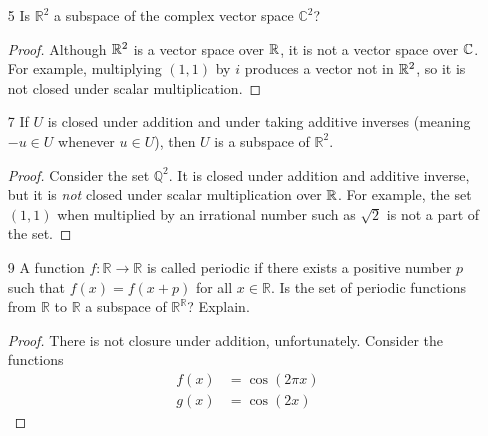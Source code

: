 \begin{enumerate}
\begin{proof}
        Consider $f$ in the set and $\lambda \in \R$. Let us show that $(\lambda f)(x) = \lambda f(x)$ is in the set. 
        \begin{align*}
            (\lambda f)'(-1) &= \\
            \lambda f'(-1) &= \\
            3\lambda f(2) &= \\
            3(\lambda f)(2)
        \end{align*}
        So we are closed under scalar multiplication.
    \end{proof}

    \item[5] Is $\mathbb{R}^2$ a subspace of the complex vector space $\mathbb{C}^2$?
    
    \begin{proof}
        Although $\mathbb{R}^2$ is a vector space over $\mathbb{R}$, it is not a vector space over $\mathbb{C}$. For example, multiplying $(1, 1)$ by $i$ produces a vector not in $\mathbb{R}^2$, so it is not closed under scalar multiplication. 
    \end{proof}

    \item[7] If \(U\) is closed under addition and under taking additive inverses (meaning
    \(-u \in U\) whenever \(u \in U\)), then \(U\) is a subspace of \(\mathbb{R}^2\).

    \begin{proof}
        Consider the set $\mathbb{Q}^2$. It is closed under addition and additive inverse, but it is \emph{not} closed under scalar multiplication over $\mathbb{R}$. For example, the set $(1, 1)$ when multiplied by an irrational number such as $\sqrt{2}$ is not a part of the set.
    \end{proof}

    \item[9] A function \(f : \mathbb{R} \to \mathbb{R}\) is called periodic if there exists a positive number
    \(p\) such that \(f(x) = f(x + p)\) for all \(x \in \mathbb{R}\). Is the set of periodic functions
    from \(\mathbb{R}\) to \(\mathbb{R}\) a subspace of \(\mathbb{R}^{\mathbb{R}}\)? Explain.

    \begin{proof}
        There is not closure under addition, unfortunately. Consider the functions 
        \begin{align*}
            f(x) &= \cos(2\pi x) \\
            g(x) &= \cos(2x)
        \end{align*}


\end{proof}
\end{enumerate}
